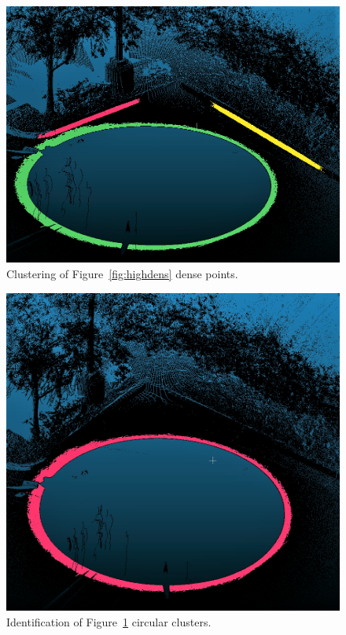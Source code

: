 \begin{figure}
  \centering
  \includegraphics[scale=0.5]{img/cluster.png}
  \caption{Clustering of Figure~\ref{fig:highdens} dense points.}
  \label{fig:cluster}
\end{figure}

\begin{figure}
  \centering
  \includegraphics[scale=0.5]{img/circular.png}
  \caption{Identification of Figure~\ref{fig:cluster} circular clusters.}
  \label{fig:circular}
\end{figure}

